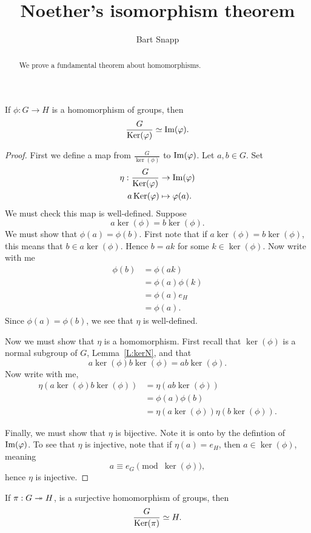 \documentclass{ximera}
\author{Bart Snapp}
\title{Noether's isomorphism theorem}
\begin{document}
\begin{abstract}
  We prove a fundamental theorem about homomorphisms.
\end{abstract}
\maketitle

\begin{theorem}[Noether]\label{T:NI}
  If $\phi:G\to H$ is a homomorphism of groups, then
  \[
  \frac{G}{\mathop{\mathrm{Ker}}\nolimits(\varphi)} \simeq \operatorname{Im}(\varphi).
  \]
  \begin{proof}
    First we define a map from $\frac{G}{\ker(\phi)}$ to $\operatorname{Im}(\varphi)$.
    Let $a,b\in G$. Set
    \begin{align*}
      \eta: \frac{G}{\mathop{\mathrm{Ker}}\nolimits(\varphi)} &\to \operatorname{Im}(\varphi)\\
      a\mathop{\mathrm{Ker}}\nolimits(\varphi) &\mapsto \varphi(a).
    \end{align*}
    We must check this map is
    well-defined. Suppose
    \[
    a \ker(\phi) = b\ker(\phi).
    \]
    We must show that $\phi(a) = \phi(b)$. First note that if $a
    \ker(\phi) = b\ker(\phi)$, this means that $b\in
    a\ker(\phi)$. Hence $b = ak$ for some $k\in\ker(\phi)$. Now write
    with me
    \begin{align*}
      \phi(b) &=\phi(ak)\\
      &=\phi(a)\phi(k)\\
      &=\phi(a) e_H\\
      &=\phi(a).
    \end{align*}
    Since $\phi(a) = \phi(b)$, we see that $\eta$ is well-defined.


    
    Now we must show that $\eta$ is a homomorphism. First recall that
    $\ker(\phi)$ is a normal subgroup of $G$, Lemma~\ref{L:kerN}, and
    that
    \[
    a\ker(\phi) b\ker(\phi)  =  ab\ker(\phi).
    \]
    Now write with me, 
    \begin{align*}
    \eta(a\ker(\phi) b\ker(\phi)) &= \eta(ab\ker(\phi))\\
    &= \phi(a)\phi(b)\\
    &= \eta(a\ker(\phi)) \eta(b\ker(\phi)).
    \end{align*}



    Finally, we must show that $\eta$ is bijective. Note it is onto by
    the defintion of $\operatorname{Im}(\varphi)$.  To see that $\eta$ is injective,
    note that if $\eta(a) = e_H$, then $a\in \ker(\phi)$, meaning
    \[
    a\equiv e_G \pmod{\ker(\phi)},
    \]
    hence $\eta$ is injective. 
  \end{proof}
\end{theorem}

\begin{corollary}
  If $\pi:G\twoheadrightarrow H$, is a surjective homomorphism of groups, then
  \[
  \frac{G}{\mathop{\mathrm{Ker}}\nolimits(\pi)} \simeq H.
  \]
\end{corollary}
\end{document}
